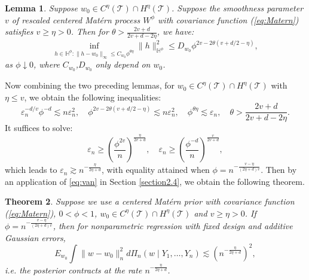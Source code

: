 \documentclass[ejs,noshowframe]{imsart}
\theoremstyle{plain}
\newtheorem{theorem}{Theorem}[section]
\newtheorem{lemma}[theorem]{Lemma}
\theoremstyle{definition}
\theoremstyle{remark}
\begin{document}
\begin{lemma}
Suppose $w_0 \in C^{\eta}(\mathcal{T}) \cap H^{\eta}(\mathcal{T})$. Suppose the smoothness parameter $v$ of   rescaled centered Mat\'ern process $W^{\phi}$  with  covariance function  (\ref{eq:Matern})  satisfies  $ v \ge \eta >0$.  Then for $\theta > \frac{2v+d}{2v+d-2 \eta}$, we have:
$$
\inf_{h \in \mathbb{H}^{\phi}:\|h-w_0\|_{\infty}\le C_{w_0}\phi^{\theta \eta}}\|h\|_{\mathbb{H}^{\phi}}^2 \le D_{w_0}\phi^{2v-2\theta(v+d/2-\eta)},
$$
as $\phi \downarrow 0$, where $C_{w_0}$,$D_{w_0}$ only depend on $w_0$.
 \label{matern decentering}
\end{lemma}
Now  combining the two preceding lemmas, for  $w_0 \in C^{\eta}(\mathcal{T}) \cap H^{\eta}(\mathcal{T})$ with $ \eta \leq v$, we obtain the following inequalities:
\begin{displaymath}
    \varepsilon_n^{-d/v} \phi^{-d} \lesssim n \varepsilon_n^2 , \quad \phi^{2v-2\theta(v+d/2-\eta)} \lesssim n \varepsilon_n^2, \quad\phi^{\theta \eta} \lesssim  \varepsilon_n,  \quad \theta > \frac{2v+d}{2v+d-2 \eta}.
\end{displaymath}
It suffices to solve:
\begin{displaymath}
   \varepsilon_n \ge \left( \frac{\phi^{2v}}{n}\right)^{\frac{\eta}{2v+d}}, \quad
   \varepsilon_n \ge \left( \frac{\phi^{-d}}{n}\right)^{\frac{v}{2v+d}}, 
\end{displaymath}
which leads to $\varepsilon_n \gtrsim n^{-\frac{\eta}{2\eta+d}}$, with equality attained when $\phi=n^{-\frac{v-\eta}{(2\eta+d)v}}$. Then by    an  application of \eqref{eq:van} in Section \ref{section2.4}, we obtain the following theorem. 

\begin{theorem}
Suppose we use a centered Mat\'ern prior  with  covariance function  (\ref{eq:Matern}),  $0<\phi<1$,  $w_0 \in C^{\eta}(\mathcal{T}) \cap H^{\eta}(\mathcal{T})$ and $v \ge \eta>0$.  If $\phi=n^{-\frac{v-\eta}{(2\eta+d)v}}$,  then  for nonparametric regression with fixed design and additive Gaussian errors, 
$$
E_{w_0} \int \|w-w_0\|_n^2 d \Pi_n(w\mid Y_1,\ldots,Y_n) \lesssim (n^{-\frac{\eta}{2\eta+d}})^2,
$$
i.e. the posterior contracts at the rate $n^{-\frac{\eta}{2\eta+d}}$.  \label{rescale matern theorem}
\end{theorem}   
\end{document}

